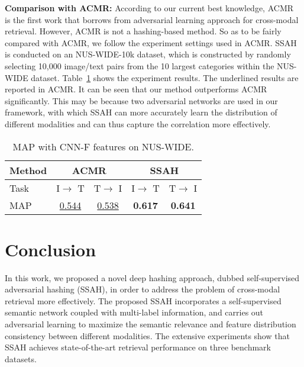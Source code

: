 \documentclass[10pt,twocolumn,letterpaper]{article}
\begin{document}
\textbf{Comparison with ACMR:} According to our current best knowledge, ACMR~\cite{Wang2017MM} is the first work that borrows from adversarial learning approach for cross-modal retrieval. However, ACMR is not a hashing-based method. So as to be fairly compared with ACMR, we follow the experiment settings used in ACMR. SSAH is conducted on an NUS-WIDE-10k dataset, which is constructed by randomly selecting 10,000 image/text pairs from the 10 largest categories within the NUS-WIDE dataset. Table~\ref{result: NUS} shows the experiment results. The underlined results are reported in ACMR. It can be seen that our method outperforms ACMR significantly. This may be because two adversarial networks are used in our framework, with which SSAH can more accurately learn the distribution of different modalities and can thus capture the correlation more effectively.
\begin{table}[!t]
	\begin{center}
		\caption{MAP with CNN-F features on NUS-WIDE.}
		\vspace{-0.25cm}
		\label{result: NUS}
		\begin{tabular}{|l|c|c|c|c|}
			\hline
			Method   &  \multicolumn{2}{c|}{ACMR} &  \multicolumn{2}{c|}{SSAH}\\
			\hline
			Task & I$\rightarrow$ T & T$\rightarrow$ I & I$\rightarrow$ T & T$\rightarrow$ I\\
			\hline
			MAP &   \underline{0.544}  & \underline{0.538} &   \textbf{0.617}     &  \textbf{0.641}\\
			\hline
		\end{tabular}
		\vspace{-0.8cm}
	\end{center}
\end{table}
\vspace{-0.25cm}
\section{Conclusion}
\vspace{-0.15cm}
\label{section: Conclusion}
In this work, we proposed a novel deep hashing approach, dubbed self-supervised adversarial hashing (SSAH), in order to address the problem of cross-modal retrieval more effectively. The proposed SSAH incorporates a self-supervised semantic network coupled with multi-label information, and carries out adversarial learning to maximize the semantic relevance and feature distribution consistency between different modalities. The extensive experiments show that SSAH achieves state-of-the-art retrieval performance on three benchmark datasets.
\vspace{-0.25cm}
\end{document}
